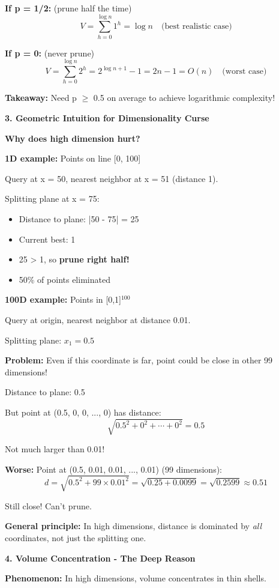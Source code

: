 \documentclass[12pt]{article}
\begin{document}
\begin{explanation}
\textbf{If p = 1/2:} (prune half the time)
\[
V = \sum_{h=0}^{\log n} 1^h = \log n \quad \text{(best realistic case)}
\]

\textbf{If p = 0:} (never prune)
\[
V = \sum_{h=0}^{\log n} 2^h = 2^{\log n + 1} - 1 = 2n - 1 = O(n) \quad \text{(worst case)}
\]

\textbf{Takeaway:} Need p $\geq$ 0.5 on average to achieve logarithmic complexity!

\textbf{3. Geometric Intuition for Dimensionality Curse}

\textbf{Why does high dimension hurt?}

\textbf{1D example:} Points on line [0, 100]

Query at x = 50, nearest neighbor at x = 51 (distance 1).

Splitting plane at x = 75:
\begin{itemize}
    \item Distance to plane: |50 - 75| = 25
    \item Current best: 1
    \item 25 > 1, so \textbf{prune right half!}
    \item 50\% of points eliminated
\end{itemize}

\textbf{100D example:} Points in [0,1]$^{100}$

Query at origin, nearest neighbor at distance 0.01.

Splitting plane: $x_1 = 0.5$

\textbf{Problem:} Even if this coordinate is far, point could be close in other 99 dimensions!

Distance to plane: 0.5

But point at (0.5, 0, 0, ..., 0) has distance:
\[
\sqrt{0.5^2 + 0^2 + \cdots + 0^2} = 0.5
\]

Not much larger than 0.01!

\textbf{Worse:} Point at (0.5, 0.01, 0.01, ..., 0.01) (99 dimensions):
\[
d = \sqrt{0.5^2 + 99 \times 0.01^2} = \sqrt{0.25 + 0.0099} = \sqrt{0.2599} \approx 0.51
\]

Still close! Can't prune.

\textbf{General principle:} In high dimensions, distance is dominated by \textit{all} coordinates, not just the splitting one.

\textbf{4. Volume Concentration - The Deep Reason}

\textbf{Phenomenon:} In high dimensions, volume concentrates in thin shells.


\end{explanation}
\end{document}
